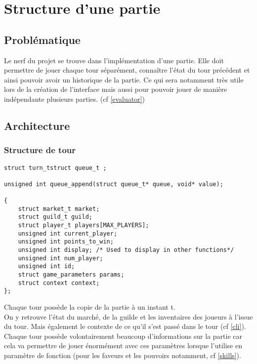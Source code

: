 \section{Structure d'une partie}

\label{game}

\subsection*{Problématique}

Le nerf du projet se trouve dans l'implémentation d'une partie. Elle doit permettre de jouer chaque tour séparément, connaître l'état du tour précédent et ainsi pouvoir avoir un historique de la partie. Ce qui sera notamment très utile lors de la création de l'interface mais aussi pour pouvoir jouer de manière indépendante plusieurs parties. (cf \ref{evaluator})
\subsection{Architecture}

\subsubsection*{Structure de tour}

\begin{lstlisting}[frame=single, caption={Implémentation de la structure turn\_t}]
struct turn_tstruct queue_t ;

unsigned int queue_append(struct queue_t* queue, void* value);

{
	struct market_t market;
	struct guild_t guild;
	struct player_t players[MAX_PLAYERS];
	unsigned int current_player;
	unsigned int points_to_win;
	unsigned int display; /* Used to display in other functions*/
	unsigned int num_player;
	unsigned int id;
	struct game_parameters params;
	struct context context;
};
\end{lstlisting}

Chaque tour possède la copie de la partie à un instant t.\\
On y retrouve l'état du marché, de la guilde et les inventaires des joueurs à l'issue du tour. Mais également le contexte de ce qu'il s'est passé dans le tour (cf \ref{cli}).\\
Chaque tour possède volontairement beaucoup d'informations sur la partie car cela va permettre de jouer énormément avec ces paramètres lorsque l'utilise en paramètre de fonction (pour les faveurs et les pouvoirs notamment, cf \ref{skills}).

